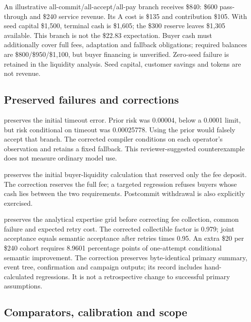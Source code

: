 \documentclass[11pt,letterpaper]{article}
\begin{document}
An illustrative all-commit/all-accept/all-pay branch receives \$840:
\$600 pass-through and \$240 service revenue. Its A cost is \$135 and
contribution \$105. With seed capital \$1,500, terminal cash is \$1,605;
the \$300 reserve leaves \$1,305 available. This branch is not the
\$22.83 expectation. Buyer cash must additionally cover full fees,
adaptation and fallback obligations; required balances are
\$800/\$950/\$1,100, but buyer financing is unverified. Zero-seed
failure is retained in the liquidity analysis. Seed capital, customer
savings and tokens are not revenue.

\hypertarget{preserved-failures-and-corrections}{%
\subsection{Preserved failures and
corrections}\label{preserved-failures-and-corrections}}

 preserves the initial
timeout error. Prior risk was 0.00004, below a 0.0001 limit, but risk
conditional on timeout was 0.00025778. Using the prior would falsely
accept that branch. The corrected compiler conditions on each operator's
observation and retains a fixed fallback. This reviewer-suggested
counterexample does not measure ordinary model use.

 preserves the initial buyer-liquidity
calculation that reserved only the fee deposit. The correction reserves
the full fee; a targeted regression refuses buyers whose cash lies
between the two requirements. Postcommit withdrawal is also explicitly
exercised.

 preserves the analytical expertise
grid before correcting fee collection, common failure and expected retry
cost. The corrected collectible factor is 0.979; joint acceptance equals
semantic acceptance after retries times 0.95. An extra \$20 per \$240
cohort requires 8.9601 percentage points of one-attempt conditional
semantic improvement. The correction preserves byte-identical primary
summary, event tree, confirmation and campaign outputs; its record
includes hand-calculated regressions. It is not a retrospective change
to successful primary assumptions.

\hypertarget{comparators-calibration-and-scope}{%
\subsection{Comparators, calibration and
scope}\label{comparators-calibration-and-scope}}
\end{document}
